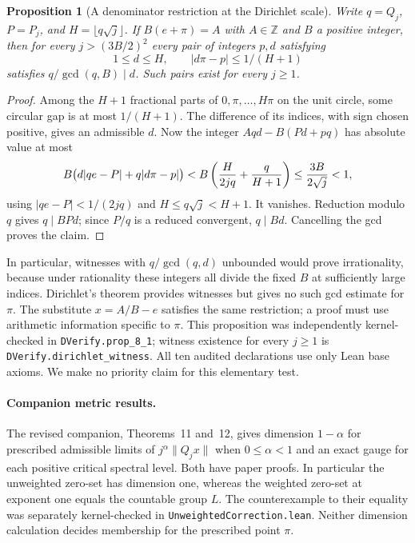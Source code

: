 \documentclass[11pt]{amsart}
\newtheorem{proposition}[theorem]{Proposition}
\theoremstyle{definition}
\theoremstyle{remark}
\numberwithin{equation}{section}
\newcommand{\Z}{\mathbb{Z}}
\begin{document}
\begin{proposition}[A denominator restriction at the Dirichlet scale]
\label{prop:dirichlet-divisor}
Write $q=Q_j$, $P=P_j$, and $H=\lfloor q\sqrt j\rfloor$.
If $B(e+\pi)=A$ with $A\in\Z$ and $B$ a positive integer,
then for every $j>(3B/2)^2$ every pair of integers $p,d$ satisfying
\[
 1\le d\le H,\qquad |d\pi-p|\le 1/(H+1)
\]
satisfies $q/\gcd(q,B)\mid d$. Such pairs exist for every $j\ge1$.
\end{proposition}
\begin{proof}
Among the $H+1$ fractional parts of $0,\pi,\ldots,H\pi$ on the
unit circle, some circular gap is at most $1/(H+1)$. The difference
of its indices, with sign chosen positive, gives an admissible $d$.
Now the integer $Aqd-B(Pd+pq)$ has absolute value at most
\[
 B\bigl(d|qe-P|+q|d\pi-p|\bigr)
 < B\left({H\over 2jq}+{q\over H+1}\right)
 \le {3B\over 2\sqrt j}<1,
\]
using $|qe-P|<1/(2jq)$ and $H\le q\sqrt j<H+1$.
It vanishes. Reduction modulo $q$ gives $q\mid BPd$; since $P/q$
is a reduced convergent, $q\mid Bd$. Cancelling the gcd proves the claim.
\end{proof}
In particular, witnesses with $q/\gcd(q,d)$ unbounded would prove
irrationality, because under rationality these integers all divide
the fixed $B$ at sufficiently large indices. Dirichlet's theorem
provides witnesses but gives no such gcd estimate for $\pi$.
The substitute $x=A/B-e$ satisfies the same restriction; a proof
must use arithmetic information specific to $\pi$. This proposition was independently kernel-checked in \texttt{DVerify.prop\_8\_1}; witness existence for every $j\ge1$ is \texttt{DVerify.dirichlet\_witness}. All ten audited declarations use only Lean base axioms. We make no priority claim for this elementary test.

\paragraph{Companion metric results.} The revised companion, Theorems~11
and~12, gives dimension $1-\alpha$ for prescribed admissible limits
of $j^\alpha\|Q_jx\|$ when $0\le\alpha<1$ and an exact gauge for each
positive critical spectral level. Both have paper proofs. In particular
the unweighted zero-set has dimension one, whereas the weighted
zero-set at exponent one equals the countable group $L$. The
counterexample to their equality was separately kernel-checked in
\texttt{UnweightedCorrection.lean}. Neither dimension calculation
decides membership for the prescribed point $\pi$.
\end{document}

